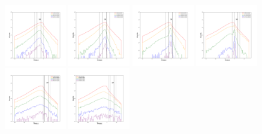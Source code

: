 \documentclass[12pt,prd]{article}
\begin{document}
\begin{figure}[h!]
\includegraphics[width=0.24\textwidth]{../figures/scanning_plotsgaiascan_l337_5_b74_4_ra201_9_dec14_0_npy_10.pdf}
\includegraphics[width=0.24\textwidth]{../figures/scanning_plotsgaiascan_l337_5_b74_4_ra201_9_dec14_0_npy_11.pdf}
\includegraphics[width=0.24\textwidth]{../figures/scanning_plotsgaiascan_l337_5_b74_4_ra201_9_dec14_0_npy_12.pdf}
\includegraphics[width=0.24\textwidth]{../figures/scanning_plotsgaiascan_l337_5_b74_4_ra201_9_dec14_0_npy_13.pdf}
\includegraphics[width=0.24\textwidth]{../figures/scanning_plotsgaiascan_l337_5_b74_4_ra201_9_dec14_0_npy_14.pdf}
\includegraphics[width=0.24\textwidth]{../figures/scanning_plotsgaiascan_l337_5_b74_4_ra201_9_dec14_0_npy_15.pdf}

\end{figure}
\end{document}
